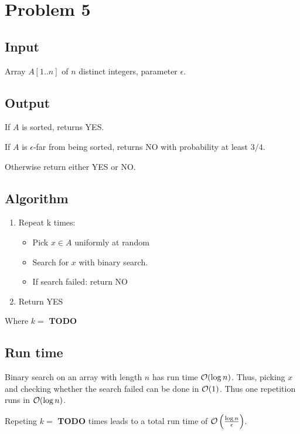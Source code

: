 \section*{Problem 5}

\subsection*{Input}

Array $A[1..n]$ of $n$ distinct integers, parameter $\epsilon$.

\subsection*{Output}

If $A$ is sorted, returns YES.

If $A$ is $\epsilon$-far from being sorted, returns NO with probability at least $3/4$.

Otherwise return either YES or NO.

\subsection*{Algorithm}


\begin{enumerate}
    \item Repeat k times:

\begin{itemize}
    \item Pick $x \in A$ uniformly at random
    \item Search for $x$ with binary search.
    \item If search failed: return NO
\end{itemize}

\item Return YES
\end{enumerate}

Where $k = $ \textbf{TODO}


\subsection*{Run time}

Binary search on an array with length $n$ has run time $\mathcal{O}(\log n)$. Thus, picking $x$ and checking whether the search failed can be done in $\mathcal{O}(1)$.
Thus one repetition runs in $\mathcal{O}(\log n)$.

Repeting $k = $ \textbf{TODO} times leads to a total run time of $\mathcal{O}\left(\frac{\log n}\epsilon{}\right)$.

